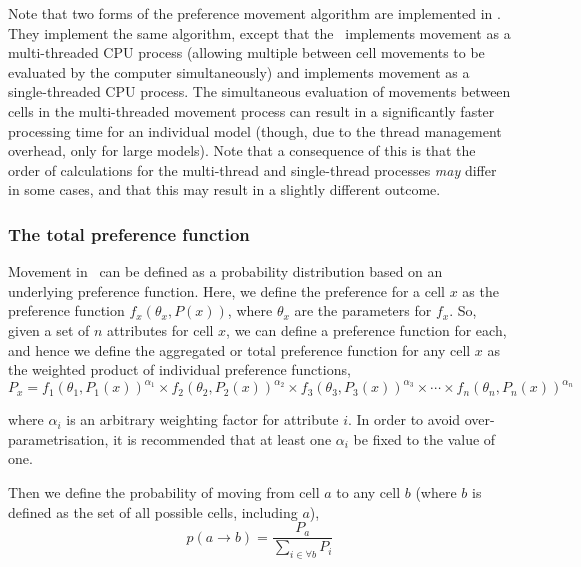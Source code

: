 Note that two forms of the preference movement algorithm are implemented in \SPM. They implement the same algorithm, except that the \ implements movement as a multi-threaded CPU process (allowing multiple between cell movements to be evaluated by the computer simultaneously) and  implements movement as a single-threaded CPU process. The simultaneous evaluation of movements between cells in the multi-threaded movement process can result in a significantly faster processing time for an individual model (though, due to the thread management overhead, only for large models). Note that a consequence of this is that the order of calculations for the multi-thread and single-thread processes \emph{may} differ in some cases, and that this may result in a slightly different outcome.

\subsubsection*{The total preference function}

Movement in \SPM\ can be defined as a probability distribution based on an underlying preference function. Here, we define the preference for a cell $x$ as the preference function $f_x(\theta_x,P(x))$, where $\theta_x$ are the parameters for $f_x$. So, given a set of $n$ attributes for cell $x$, we can define a preference function for each, and hence we define the aggregated or total preference function for any cell $x$ as the weighted product of individual preference functions,
\begin{equation}
  P_x=f_1(\theta_1,P_1(x))^{\alpha_1} \times f_2(\theta_2,P_2(x))^{\alpha_2} \times f_3(\theta_3,P_3(x))^{\alpha_3} \times \cdots \times f_n(\theta_n,P_n(x))^{\alpha_n}
\end{equation}

where $\alpha_i$ is an arbitrary weighting factor for attribute $i$. In order to avoid over-parametrisation, it is recommended that at least one $\alpha_i$ be fixed to the value of one.

Then we define the probability of moving from cell $a$ to any cell $b$ (where $b$ is defined as the set of all possible cells, including $a$),
\begin{equation}
  p(a\rightarrow b) = \frac{P_a}{\sum\limits_{i \in \forall b} P_i}
\end{equation}

